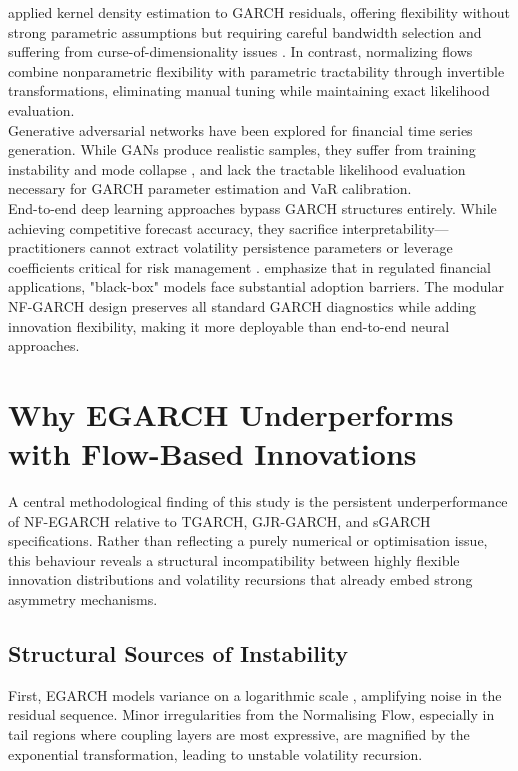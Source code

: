 \documentclass[oneside,12pt]{CUEDthesisPSnPDF}
\newcommand{\textcite}{\citet}
\newcommand{\parencite}{\citep}
\begin{document}
\textcite{engle1993measuring} applied kernel density estimation to GARCH residuals, offering flexibility without strong parametric assumptions but requiring careful bandwidth selection and suffering from curse-of-dimensionality issues \parencite{silverman1986density}. In contrast, normalizing flows combine nonparametric flexibility with parametric tractability through invertible transformations, eliminating manual tuning while maintaining exact likelihood evaluation.\\

Generative adversarial networks \parencite{goodfellow2014generative, wiese2020quant} have been explored for financial time series generation. While GANs produce realistic samples, they suffer from training instability and mode collapse \parencite{arjovsky2017wasserstein}, and lack the tractable likelihood evaluation necessary for GARCH parameter estimation and VaR calibration.\\

End-to-end deep learning approaches \parencite{bao2017deep, kim2018forecasting} bypass GARCH structures entirely. While achieving competitive forecast accuracy, they sacrifice interpretability—practitioners cannot extract volatility persistence parameters or leverage coefficients critical for risk management \parencite{rudin2019stop}. \textcite{harvey2022machine} emphasize that in regulated financial applications, "black-box" models face substantial adoption barriers. The modular NF-GARCH design preserves all standard GARCH diagnostics while adding innovation flexibility, making it more deployable than end-to-end neural approaches.\\


\section{Why EGARCH Underperforms with Flow-Based Innovations}
\label{sec:disc_egarch}

\noindent
A central methodological finding of this study is the persistent underperformance of NF-EGARCH relative to TGARCH, GJR-GARCH, and sGARCH specifications. Rather than reflecting a purely numerical or optimisation issue, this behaviour reveals a structural incompatibility between highly flexible innovation distributions and volatility recursions that already embed strong asymmetry mechanisms.\\

\subsection{Structural Sources of Instability}
\noindent
First, EGARCH models variance on a logarithmic scale \parencite{nelson1991conditional}, amplifying noise in the residual sequence. Minor irregularities from the Normalising Flow, especially in tail regions where coupling layers are most expressive, are magnified by the exponential transformation, leading to unstable volatility recursion.\\
\end{document}
